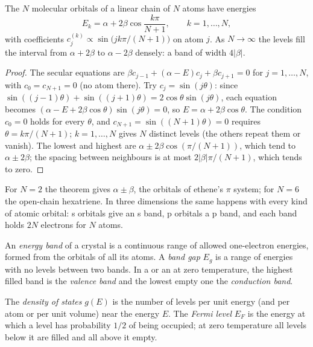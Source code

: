 \begin{theorem}\label{thm:b3:solid-state:chain}
The $N$ molecular orbitals of a linear chain of $N$ atoms have energies
\[
  E_k = \alpha + 2\beta\cos\frac{k\pi}{N + 1}, \qquad k = 1, \dots, N,
\]
with coefficients $c_j^{(k)} \propto \sin\bigl(jk\pi/(N + 1)\bigr)$ on atom $j$. As $N \to \infty$ the levels fill the
interval from $\alpha + 2\beta$ to $\alpha - 2\beta$ densely: a band of width $4|\beta|$.
\end{theorem}

\begin{proof}
The secular equations are $\beta c_{j-1} + (\alpha - E)c_j + \beta c_{j+1} = 0$ for $j = 1, \dots, N$, with $c_0 = c_{N+1} = 0$
(no atom there). Try $c_j = \sin(j\theta)$: since $\sin((j - 1)\theta) + \sin((j + 1)\theta) = 2\cos\theta\sin(j\theta)$, each
equation becomes $(\alpha - E + 2\beta\cos\theta)\sin(j\theta) = 0$, so $E = \alpha + 2\beta\cos\theta$. The condition $c_0 = 0$ holds
for every $\theta$, and $c_{N+1} = \sin((N + 1)\theta) = 0$ requires $\theta = k\pi/(N + 1)$; $k = 1, \dots, N$ gives $N$ distinct
levels (the others repeat them or vanish). The lowest and highest are
$\alpha \pm 2\beta\cos(\pi/(N + 1))$, which tend to $\alpha \pm 2\beta$; the spacing between neighbours is at most
$2|\beta|\pi/(N + 1)$, which tends to zero.
\end{proof}

For $N = 2$ the theorem gives $\alpha \pm \beta$, the orbitals of ethene's $\pi$ system; for
$N = 6$ the open-chain hexatriene. In three dimensions the same happens with
every kind of atomic orbital: s orbitals give an s band, p orbitals a p band,
and each band holds $2N$ electrons for $N$ atoms.

\begin{definition}[Bands]\label{def:b3:solid-state:band}
An \emph{energy band} of a crystal is a continuous range of
allowed one-electron energies, formed from the orbitals of all its atoms. A
\emph{band gap} $E_g$ is a range of energies with no levels between two
bands. In a  or an  at zero temperature, the highest
filled band is the \emph{valence band} and the lowest empty
one the \emph{conduction band}.
\end{definition}

\begin{definition}\label{def:b3:solid-state:fermi}
The \emph{density of states} $g(E)$ is the number of
levels per unit energy (and per atom or per unit volume) near the energy $E$.
The \emph{Fermi level} $E_F$ is the energy at which a level has
probability $1/2$ of being occupied; at zero temperature all levels below it are
filled and all above it empty.
\end{definition}

